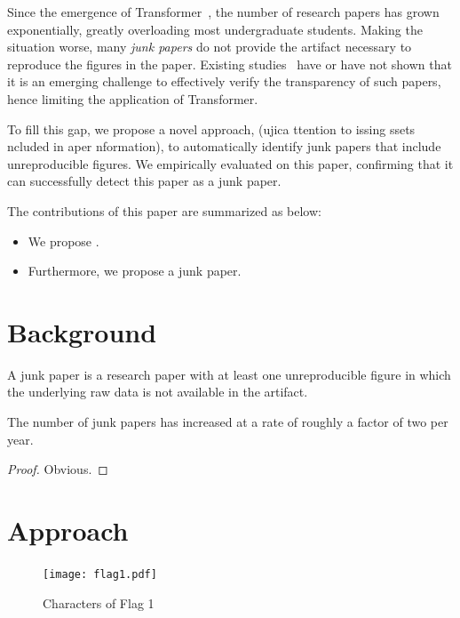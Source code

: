 \documentclass[sigconf,review,anonymous,screen]{acmart}
\begin{document}
Since the emergence of Transformer~\cite{jin2022oil}, the number of research papers has grown exponentially, greatly overloading most undergraduate students. Making the situation worse, many \emph{junk papers} do not provide the artifact necessary to reproduce the figures in the paper. Existing studies~\cite{he2024high,ye2025my,noh2024starting,jin2019software,lin2025hidden} have {\tiny or have not} shown that it is an emerging challenge to effectively verify the transparency of such papers, hence limiting the application of Transformer.

To fill this gap, we propose a novel approach, \mmp (ujica ttention to issing ssets ncluded in aper nformation), to automatically identify junk papers that include unreproducible figures. We empirically evaluated \mmp on this paper, confirming that it can successfully detect this paper as a junk paper.

The contributions of this paper are summarized as below:

\begin{itemize}
    \item We propose \mmp.
    \item Furthermore, we propose a junk paper.
\end{itemize}

\section{Background}

\begin{definition}
\label{theorem:junk}
A junk paper is a research paper with at least one unreproducible figure in which the underlying raw data is not available in the artifact.
\end{definition}

\begin{theorem}
The number of junk papers has increased at a rate of roughly a factor of two per year.
\end{theorem}

\begin{proof}
Obvious.
\end{proof}

\section{Approach}
\label{approach}

\begin{figure}
    \centering
    \texttt{[image: flag1.pdf]}
    \vspace{-1.5em}
    \caption{Characters of Flag 1}
    \label{fig:flag-1}
\end{figure}
\end{document}
